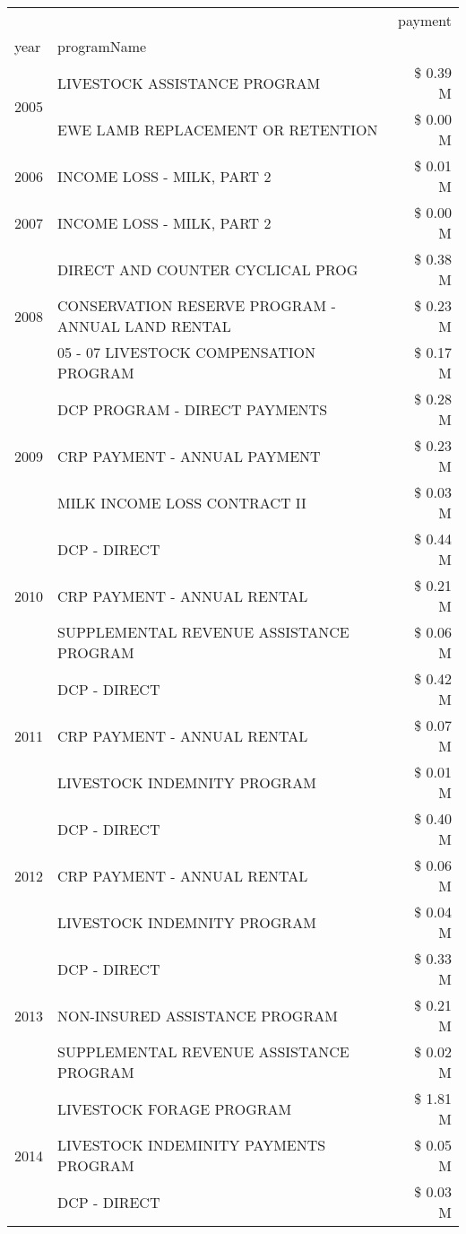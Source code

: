 \begin{tabular}{llr}
\toprule
 &  & payment \\
year & programName &  \\
\midrule
\multirow[t]{2}{*}{2005} & LIVESTOCK ASSISTANCE PROGRAM & \$ 0.39 M \\
 & EWE LAMB REPLACEMENT OR RETENTION & \$ 0.00 M \\
\cline{1-3}
2006 & INCOME LOSS - MILK, PART 2 & \$ 0.01 M \\
\cline{1-3}
2007 & INCOME LOSS - MILK, PART 2 & \$ 0.00 M \\
\cline{1-3}
\multirow[t]{3}{*}{2008} & DIRECT AND COUNTER CYCLICAL PROG & \$ 0.38 M \\
 & CONSERVATION RESERVE PROGRAM - ANNUAL LAND RENTAL & \$ 0.23 M \\
 & 05 - 07 LIVESTOCK COMPENSATION PROGRAM & \$ 0.17 M \\
\cline{1-3}
\multirow[t]{3}{*}{2009} & DCP PROGRAM - DIRECT PAYMENTS & \$ 0.28 M \\
 & CRP PAYMENT - ANNUAL PAYMENT & \$ 0.23 M \\
 & MILK INCOME LOSS CONTRACT II & \$ 0.03 M \\
\cline{1-3}
\multirow[t]{3}{*}{2010} & DCP - DIRECT & \$ 0.44 M \\
 & CRP PAYMENT - ANNUAL RENTAL & \$ 0.21 M \\
 & SUPPLEMENTAL REVENUE ASSISTANCE PROGRAM & \$ 0.06 M \\
\cline{1-3}
\multirow[t]{3}{*}{2011} & DCP - DIRECT & \$ 0.42 M \\
 & CRP PAYMENT - ANNUAL RENTAL & \$ 0.07 M \\
 & LIVESTOCK INDEMNITY PROGRAM & \$ 0.01 M \\
\cline{1-3}
\multirow[t]{3}{*}{2012} & DCP - DIRECT & \$ 0.40 M \\
 & CRP PAYMENT - ANNUAL RENTAL & \$ 0.06 M \\
 & LIVESTOCK INDEMNITY PROGRAM & \$ 0.04 M \\
\cline{1-3}
\multirow[t]{3}{*}{2013} & DCP - DIRECT & \$ 0.33 M \\
 & NON-INSURED ASSISTANCE PROGRAM & \$ 0.21 M \\
 & SUPPLEMENTAL REVENUE ASSISTANCE PROGRAM & \$ 0.02 M \\
\cline{1-3}
\multirow[t]{3}{*}{2014} & LIVESTOCK FORAGE PROGRAM & \$ 1.81 M \\
 & LIVESTOCK INDEMINITY PAYMENTS PROGRAM & \$ 0.05 M \\
 & DCP - DIRECT & \$ 0.03 M \\

\end{tabular}
